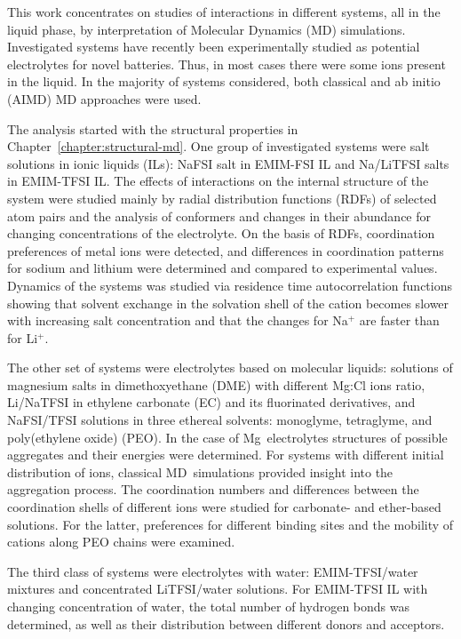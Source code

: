 
This work concentrates on studies of interactions in different systems, all in the liquid phase, by interpretation of Molecular Dynamics (MD) simulations. Investigated systems have recently been experimentally studied as potential electrolytes for novel batteries. Thus, in most cases there were some ions present in the liquid. In the majority of systems considered, both classical and ab initio (AIMD) MD approaches were used.

The analysis started with the structural properties in Chapter~\ref{chapter:structural-md}. One group of investigated systems were salt solutions in ionic liquids (ILs): NaFSI salt in EMIM-FSI IL and Na/LiTFSI salts in EMIM-TFSI IL. The effects of interactions on the internal structure of the system were studied mainly by radial distribution functions (RDFs) of selected atom pairs and the analysis of conformers and changes in their abundance for changing concentrations of the electrolyte. On the basis of RDFs, coordination preferences of metal ions were detected, and differences in coordination patterns for sodium and lithium were determined and compared to experimental values. Dynamics of the systems was studied via residence time autocorrelation functions showing that solvent exchange in the solvation shell of the cation becomes slower with increasing salt concentration and that the changes for Na$^{+}$ are faster than for Li$^{+}$.

The other set of systems were electrolytes based on molecular liquids: solutions of magnesium salts in dimethoxyethane (DME) with different Mg:Cl ions ratio, Li/NaTFSI in ethylene carbonate (EC) and its fluorinated derivatives, and NaFSI/TFSI solutions in three ethereal solvents: monoglyme, tetraglyme, and poly(ethylene oxide) (PEO). In the case of Mg~electrolytes structures of possible aggregates and their energies were determined. For systems with different initial distribution of ions, classical MD~simulations provided insight into the aggregation process. The coordination numbers and differences between the coordination shells of different ions were studied for carbonate- and ether-based solutions. For the latter, preferences for different binding sites and the mobility of cations along PEO chains were examined.

The third class of systems were electrolytes with water: EMIM-TFSI/water mixtures and concentrated LiTFSI/water solutions. For EMIM-TFSI IL with changing concentration of water, the total number of hydrogen bonds was determined, as well as their distribution between different donors and acceptors.


